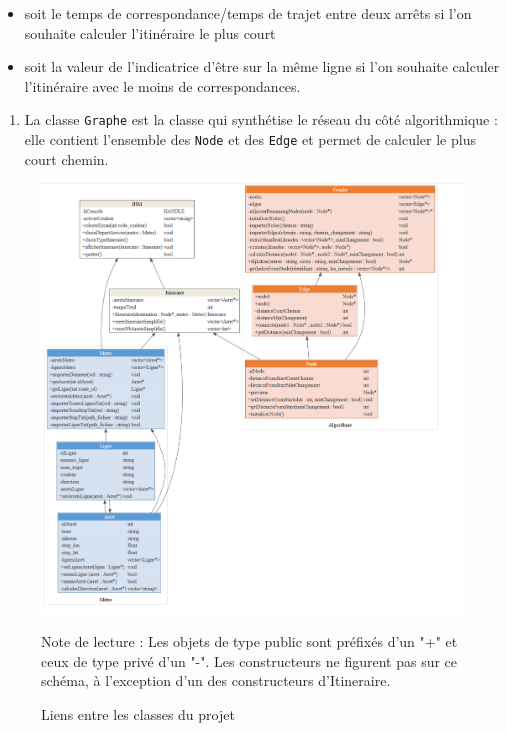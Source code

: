 \documentclass[,french]{article}
\providecommand{\tightlist}{%
  \setlength{\itemsep}{0pt}\setlength{\parskip}{0pt}}
\begin{document}
\begin{itemize}
\tightlist
\item
  soit le temps de correspondance/temps de trajet entre deux arrêts si
  l'on souhaite calculer l'itinéraire le plus court
\item
  soit la valeur de l'indicatrice d'être sur la même ligne si l'on
  souhaite calculer l'itinéraire avec le moins de correspondances.
\end{itemize}

\begin{enumerate}
\def\labelenumi{\arabic{enumi}.}
\setcounter{enumi}{2}
\tightlist
\item
  La classe \texttt{Graphe} est la classe qui synthétise le réseau du
  côté algorithmique : elle contient l'ensemble des \texttt{Node} et des
  \texttt{Edge} et permet de calculer le plus court chemin.
\end{enumerate}

\begin{figure}[H]
\includegraphics{img/Diagramme_classes/diagramme.png}
\captionsetup{margin=0cm,format=hang,justification=justified}
\caption{Liens entre les classes du projet}\label{fig:diag_classes}

 \footnotesize
Note de lecture : Les objets de type public sont préfixés d'un "+" et ceux de type privé d'un "-". 
Les constructeurs ne figurent pas sur ce schéma, à l'exception d'un des constructeurs d'Itineraire. 
\end{figure}
\end{document}
